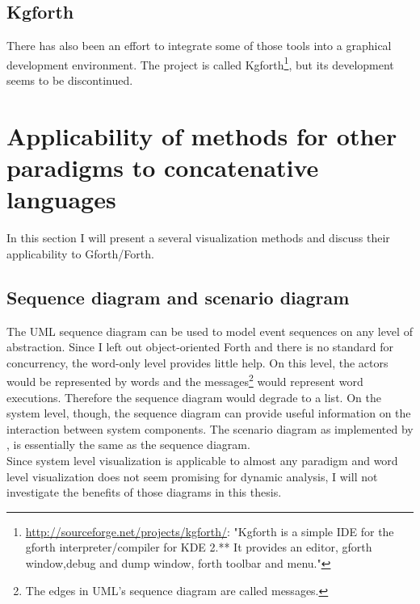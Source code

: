 \subsection*{Kgforth}

There has also been an effort to integrate some of those tools into a graphical development environment. The project is called Kgforth\footnote{\url{http://sourceforge.net/projects/kgforth/}: "Kgforth is a simple IDE for the gforth interpreter/compiler for KDE 2.** 
It provides an editor, gforth window,debug and dump window, forth toolbar and menu."}, but its development seems to be discontinued.

\section{Applicability of methods for other paradigms to concatenative languages}

In this section I will present a several visualization methods and discuss their applicability to Gforth/Forth. 

\subsection*{Sequence diagram and scenario diagram}

The \gls{UML} sequence diagram can be used to model event sequences on any level of abstraction. Since I left out object-oriented Forth and there is no standard for concurrency, the word-only level provides little help. On this level, the actors would be represented by words and the messages\footnote{The edges in UML's sequence diagram are called messages.} would represent word executions. Therefore the sequence diagram would degrade to a list. On the system level, though, the sequence diagram can provide useful information on the interaction between system components. The scenario diagram as implemented by \cite{Koskimies:1996:SUS:871313}, is essentially the same as the sequence diagram.
\\
Since system level visualization is applicable to almost any paradigm and word level visualization does not seem promising for dynamic analysis, I will not investigate the benefits of those diagrams in this thesis.

